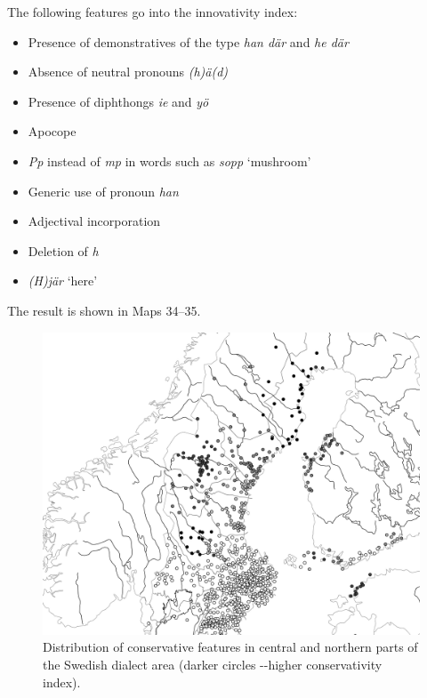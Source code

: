 The following features go into the innovativity index:

\begin{itemize}
\item 

Presence of demonstratives of the type\textit{ han där} and \textit{he där}

\item 

Absence of neutral pronouns \textit{(h)ä(d)}

\item 

Presence of diphthongs \textit{ie} and \textit{yö}

\item 

Apocope

\item 

\textit{Pp} instead of \textit{mp }in words such as \textit{sopp} ‘mushroom’

\item 

Generic use of pronoun \textit{han}

\item 

Adjectival incorporation

\item 

Deletion of \textit{h}

\item 

\textit{(H)jär} ‘here’

\end{itemize}

The result is shown in Maps 34--35. 

\begin{figure}[h]
\includegraphics[height=.5\textheight]{figures/38_DistributionConservativeFeatures}
\caption{Distribution of conservative features in central and northern parts of the Swedish dialect area (darker circles -{}-higher conservativity index). }
\label{map:34}
\end{figure}

